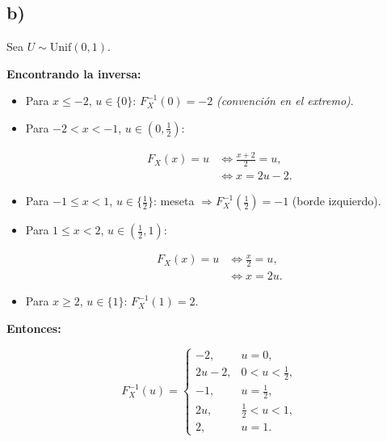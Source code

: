 \documentclass[11pt]{article}
\begin{document}
    \hypertarget{b}{%
\subsection{b)}\label{b}}

    Sea \textbf{\(U\sim\mathrm{Unif}(0,1)\)}.

\textbf{Encontrando la inversa:}

\begin{itemize}
\item
  Para \(x\le -2\), \(u\in\{0\}\): \(F_X^{-1}(0)=-2\) \emph{(convención
  en el extremo)}.
\item
  Para \(-2<x<-1\), \(u\in(0,\tfrac12)\):

  \[
  \begin{aligned}
  F_X(x)=u &\iff \frac{x+2}{2}=u,\\
           &\iff x=2u-2.
  \end{aligned}
  \]
\item
  Para \(-1\le x<1\), \(u\in\{\tfrac12\}\): meseta
  \(\Rightarrow F_X^{-1}(\tfrac12)=-1\) (borde izquierdo).
\item
  Para \(1\le x<2\), \(u\in(\tfrac12,1)\):

  \[
  \begin{aligned}
  F_X(x)=u &\iff \frac{x}{2}=u,\\
           &\iff x=2u.
  \end{aligned}
  \]
\item
  Para \(x\ge 2\), \(u\in\{1\}\): \(F_X^{-1}(1)=2\).
\end{itemize}

\textbf{Entonces:}

\[
F_X^{-1}(u)=
\begin{cases}
-2,& u=0,\\[4pt]
2u-2,& 0<u<\tfrac12,\\[4pt]
-1,& u=\tfrac12,\\[4pt]
2u,& \tfrac12<u<1,\\[4pt]
2,& u=1.
\end{cases}
\]
\end{document}
